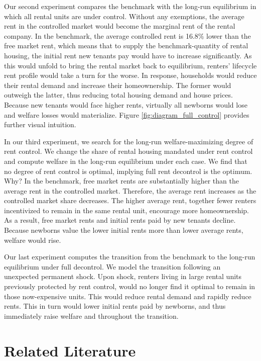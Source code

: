\documentclass[parskip=full]{article}
\begin{document}
Our second experiment compares the benchmark with the long-run equilibrium in which all rental units are under control. Without any exemptions, the average rent in the controlled market would become the marginal rent of the rental company. In the benchmark, the average controlled rent is 16.8\% lower than the free market rent, which means that to supply the benchmark-quantity of rental housing, the initial rent new tenants pay would have to increase significantly. As this would unfold to bring the rental market back to equilibrium, renters' lifecycle rent profile would take a turn for the worse. In response, households would reduce their rental demand and increase their homeownership. The former would outweigh the latter, thus reducing total housing demand and house prices. Because new tenants would face higher rents, virtually all newborns would lose and welfare losses would materialize. Figure \ref{fig:diagram_full_control} provides further visual intuition.

In our third experiment, we search for the long-run welfare-maximizing degree of rent control. We change the share of rental housing mandated under rent control and compute welfare in the long-run equilibrium under each case. We find that no degree of rent control is optimal, implying full rent decontrol is the optimum. Why? In the benchmark, free market rents are substantially higher than the average rent in the controlled market. Therefore, the average rent increases as the controlled market share decreases. The higher average rent, together fewer renters incentivized to remain in the same rental unit, encourage more homeownership. As a result, free market rents and initial rents paid by new tenants decline. Because newborns value the lower initial rents more than lower average rents, welfare would rise. 

Our last experiment computes the transition from the benchmark to the long-run equilibrium under full decontrol. We model the transition following an unexpected permanent shock. Upon shock, renters living in large rental units previously protected by rent control, would no longer find it optimal to remain in those now-expensive units. This would reduce rental demand and rapidly reduce rents. This in turn would lower initial rents paid by newborns, and thus immediately raise welfare and throughout the transition. 

\section{Related Literature}\label{sec:related_lit}
\end{document}
